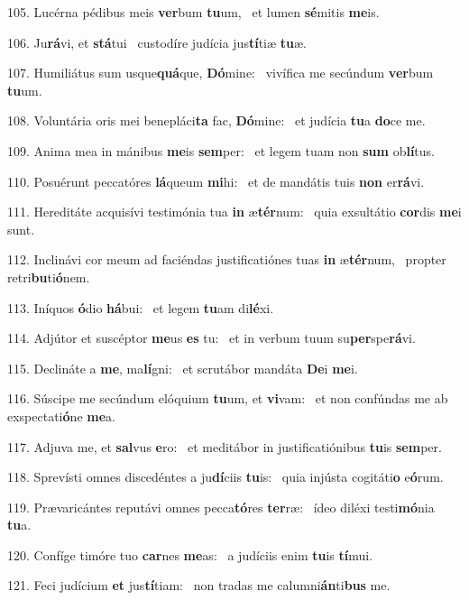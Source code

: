 105. Lucérna pédibus meis \textbf{ver}bum \textbf{tu}um, \ast\  et lumen \textbf{sé}mitis \textbf{me}is.\

106. Ju\textbf{rá}vi, et \textbf{stá}tui \ast\  custodíre judícia jus\textbf{tí}tiæ \textbf{tu}æ.\

107. Humiliátus sum usque\textbf{quá}que, \textbf{Dó}mine: \ast\  vivífica me secúndum \textbf{ver}bum \textbf{tu}um.\

108. Voluntária oris mei benepláci\textbf{ta} fac, \textbf{Dó}mine: \ast\  et judícia \textbf{tu}a \textbf{do}ce me.\

109. Anima mea in mánibus \textbf{me}is \textbf{sem}per: \ast\  et legem tuam non \textbf{sum} ob\textbf{lí}tus.\

110. Posuérunt peccatóres \textbf{lá}queum \textbf{mi}hi: \ast\  et de mandátis tuis \textbf{non} er\textbf{rá}vi.\

111. Hereditáte acquisívi testimónia tua \textbf{in} æ\textbf{tér}num: \ast\  quia exsultátio \textbf{cor}dis \textbf{me}i sunt.\

112. Inclinávi cor meum ad faciéndas justificatiónes tuas \textbf{in} æ\textbf{tér}num, \ast\  propter retri\textbf{bu}ti\textbf{ó}nem.\

113. Iníquos \textbf{ó}dio \textbf{há}bui: \ast\  et legem \textbf{tu}am di\textbf{lé}xi.\

114. Adjútor et suscéptor \textbf{me}us \textbf{es} tu: \ast\  et in verbum tuum su\textbf{per}spe\textbf{rá}vi.\

115. Declináte a \textbf{me}, ma\textbf{lí}gni: \ast\  et scrutábor mandáta \textbf{De}i \textbf{me}i.\

116. Súscipe me secúndum elóquium \textbf{tu}um, et \textbf{vi}vam: \ast\  et non confúndas me ab exspectati\textbf{ó}ne \textbf{me}a.\

117. Adjuva me, et \textbf{sal}vus \textbf{e}ro: \ast\  et meditábor in justificatiónibus \textbf{tu}is \textbf{sem}per.\

118. Sprevísti omnes discedéntes a ju\textbf{dí}ciis \textbf{tu}is: \ast\  quia injústa cogitáti\textbf{o} e\textbf{ó}rum.\

119. Prævaricántes reputávi omnes pecca\textbf{tó}res \textbf{ter}ræ: \ast\  ídeo diléxi testi\textbf{mó}nia \textbf{tu}a.\

120. Confíge timóre tuo \textbf{car}nes \textbf{me}as: \ast\  a judíciis enim \textbf{tu}is \textbf{tí}mui.\

121. Feci judícium \textbf{et} jus\textbf{tí}tiam: \ast\  non tradas me calumni\textbf{án}ti\textbf{bus} me.\

